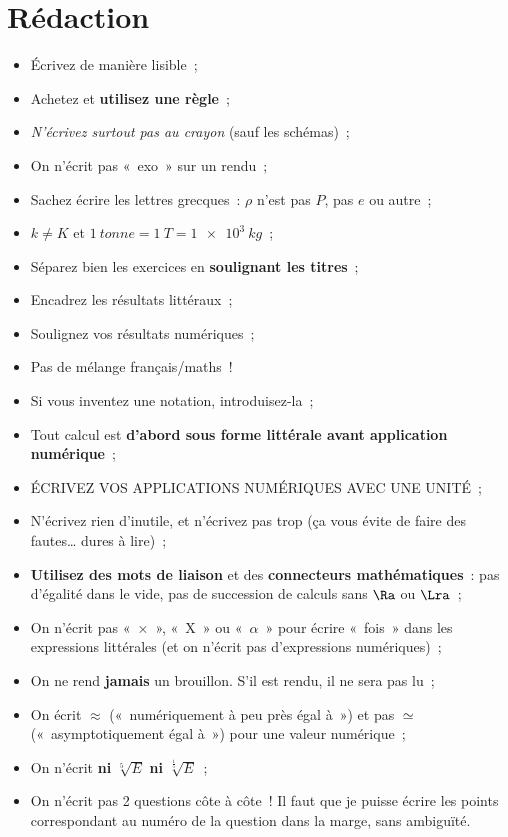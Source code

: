 \documentclass[a4paper, 11pt, final, garamond]{book}
\begin{document}
\section{Rédaction}
\begin{itemize}
	\item Écrivez de manière lisible~;
	\item Achetez et \textbf{utilisez une règle}~;
	\item \textit{N'écrivez surtout pas au crayon} (sauf les schémas)~;
	\item On n'écrit pas «~exo~» sur un rendu~;
	\item Sachez écrire les lettres grecques~: $\rho$ n'est pas $P$, pas $e$ ou
	      autre~;
	\item $k \neq K$ et $\SI{1}{tonne} = \SI{1}{T} = \SI{1e3}{kg}$~;
	\item Séparez bien les exercices en \textbf{soulignant les titres}~;
	\item Encadrez les résultats littéraux~;
	\item Soulignez vos résultats numériques~;
	\item Pas de mélange français/maths~!
	\item Si vous inventez une notation, introduisez-la~;
	\item Tout calcul est \textbf{d'abord sous forme littérale avant application
		      numérique}~;
	\item ÉCRIVEZ VOS APPLICATIONS NUMÉRIQUES AVEC UNE UNITÉ~;
	\item N'écrivez rien d'inutile, et n'écrivez pas trop (ça vous évite de faire
	      des fautes… dures à lire)~;
	\item \textbf{Utilisez des mots de liaison} et des \textbf{connecteurs
		      mathématiques}~: pas d'égalité dans le vide, pas de succession de
	      calculs sans $\Ra$ ou $\Lra$~;
	\item On n'écrit pas «~$\times$~», «~X~» ou «~$\alpha$~» pour écrire «~fois~»
	      dans les expressions littérales (et on n'écrit pas d'expressions
	      numériques)~;
	\item On ne rend \textbf{jamais} un brouillon. S'il est rendu, il ne sera
	      pas lu~;
	\item On écrit $\approx$ («~numériquement à peu près égal à~») et pas $\simeq$
	      («~asymptotiquement égal à~») pour une valeur numérique~;
	\item On n'écrit \textbf{ni} $\sqrt[5]{E}$ \textbf{ni}
	      $\sqrt[\frac{1}{5}]{E}$~;
	\item On n'écrit pas 2 questions côte à côte~! Il faut que je puisse écrire
	      les points correspondant au numéro de la question dans la marge, sans
	      ambiguïté.
\end{itemize}
\end{document}
